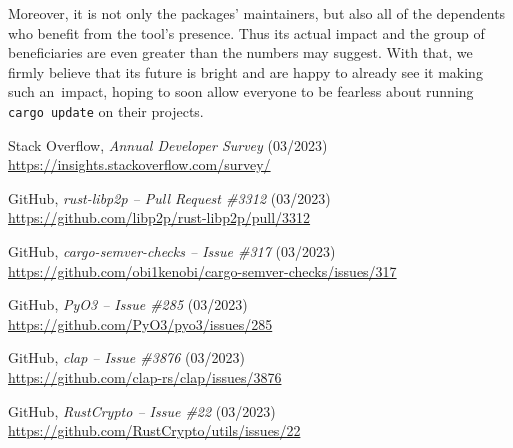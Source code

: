 \documentclass[licencjacka,en]{pracamgr}
\begin{document}
Moreover, it is not only the packages' maintainers, but also all of the dependents who benefit
from the tool's presence. Thus its actual impact and the group of beneficiaries are even greater
than the numbers may suggest. With that, we firmly believe that its future is bright and are happy
to already see it making such an~impact, hoping to soon allow everyone to be fearless about running
\texttt{cargo update} on their projects.



\appendix

\begin{thebibliography}{99}





 Stack Overflow,
	\textit{Annual Developer Survey} (03/2023) \\
	\url{https://insights.stackoverflow.com/survey/}



 GitHub,
	\textit{rust-libp2p -- Pull Request \#3312} (03/2023) \\
	\url{https://github.com/libp2p/rust-libp2p/pull/3312}



 GitHub,
	\textit{cargo-semver-checks -- Issue \#317} (03/2023) \\
	\url{https://github.com/obi1kenobi/cargo-semver-checks/issues/317}



 GitHub,
    \textit{PyO3 -- Issue \#285} (03/2023) \\
    \url{https://github.com/PyO3/pyo3/issues/285}

 GitHub,
    \textit{clap -- Issue \#3876} (03/2023) \\
    \url{https://github.com/clap-rs/clap/issues/3876}

 GitHub,
    \textit{RustCrypto -- Issue \#22} (03/2023) \\
    \url{https://github.com/RustCrypto/utils/issues/22}


\end{thebibliography}
\end{document}
